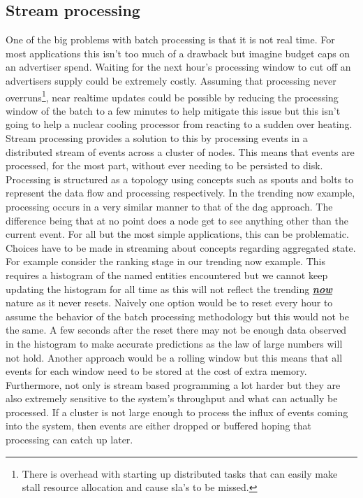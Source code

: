 \documentclass[a4paper,11pt]{scrreprt}
\begin{document}
\subsection{Stream processing}
One of the big problems with batch processing is that it is not real time. For most applications this isn't too much of a drawback but imagine budget caps on an advertiser spend. Waiting for the next hour's processing window to cut off an advertisers supply could be extremely costly. Assuming that processing never overruns\footnote{There is overhead with starting up distributed tasks that can easily make stall resource allocation and cause \acrshort{sla}'s to be missed.}, near realtime updates could be possible by reducing the processing window of the batch to a few minutes to help mitigate this issue but this isn't going to help a nuclear cooling processor from reacting to a sudden over heating. Stream processing provides a solution to this by processing events in a distributed stream of events across a cluster of nodes. This means that events are processed, for the most part, without ever needing to be persisted to disk. Processing is structured as a topology using concepts such as spouts and bolts to represent the data flow and processing respectively. In the trending now example, processing occurs in a very similar manner to that of the \acrshort{dag} approach. The difference being that at no point does a node get to see anything other than the current event. For all but the most simple applications, this can be problematic. \\

Choices have to be made in streaming about concepts regarding aggregated state. For example consider the ranking stage in our trending now example. This requires a histogram of the named entities encountered but we cannot keep updating the histogram for all time as this will not reflect the trending \textbf{\textit{\underline{now}}} nature as it never resets. Naively one option would be to reset every hour to assume the behavior of the batch processing methodology but this would not be the same. A few seconds after the reset there may not be enough data observed in the histogram to make accurate predictions as the law of large numbers will not hold. Another approach would be a rolling window but this means that all events for each window need to be stored at the cost of extra memory. Furthermore, not only is stream based programming a lot harder but they are also extremely sensitive to the system's throughput and what can actually be processed. If a cluster is not large enough to process the influx of events coming into the system, then events are either dropped or buffered hoping that processing can catch up later.\\
\end{document}
